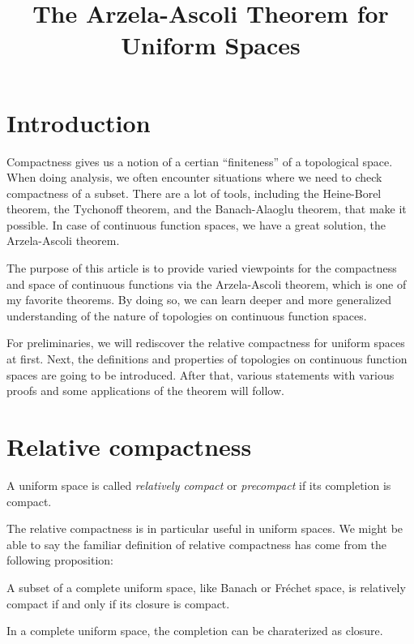 \documentclass{../exp}
\title{The Arzela-Ascoli Theorem for Uniform Spaces}
\begin{document}
\maketitle

\section{Introduction}
Compactness gives us a notion of a certian ``finiteness'' of a topological space.
When doing analysis, we often encounter situations where we need to check compactness of a subset.
There are a lot of tools, including the Heine-Borel theorem, the Tychonoff theorem, and the Banach-Alaoglu theorem, that make it possible.
In case of continuous function spaces, we have a great solution, the Arzela-Ascoli theorem.

The purpose of this article is to provide varied viewpoints for the compactness and space of continuous functions via the Arzela-Ascoli theorem, which is one of my favorite theorems.
By doing so, we can learn deeper and more generalized understanding of the nature of topologies on continuous function spaces.

For preliminaries, we will rediscover the relative compactness for uniform spaces at first.
Next, the definitions and properties of topologies on continuous function spaces are going to be introduced.
After that, various statements with various proofs and some applications of the theorem will follow.




\section{Relative compactness}

\begin{defn}
A uniform space is called \emph{relatively compact} or \emph{precompact} if its completion is compact.
\end{defn}

The relative compactness is in particular useful in uniform spaces.
We might be able to say the familiar definition of relative compactness has come from the following proposition:
\begin{prop}
A subset of a complete uniform space, like Banach or Fr\'echet space, is relatively compact if and only if its closure is compact.
\end{prop}
\begin{pf}
In a complete uniform space, the completion can be charaterized as closure.
\end{pf}
\end{document}
